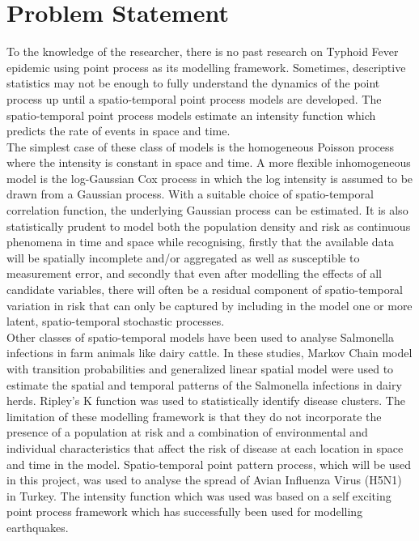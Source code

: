 \documentclass[a4paper]{thesis}
\begin{document}
\section{Problem Statement}

To the knowledge of the researcher, there is no past research on Typhoid Fever epidemic using point process as its modelling framework. Sometimes, descriptive statistics may not be enough to fully understand the dynamics of the point process up until a spatio-temporal point process models are developed. The spatio-temporal point process models estimate an intensity function which predicts the rate of events in space and time.\\

The simplest case of these class of models is the homogeneous Poisson process where the intensity is constant in space and time. A more 
flexible inhomogeneous model is the log-Gaussian Cox process in which the log intensity is assumed to be drawn from a Gaussian process.\cite{Diggle2014} With a suitable choice of spatio-temporal correlation function, the underlying
Gaussian process can be estimated. It is also statistically prudent to model both the population density and risk as continuous phenomena in time and space while recognising, firstly that the available data will be spatially incomplete and/or aggregated as well as susceptible to measurement error, and
secondly that even after modelling the effects of all candidate variables, there will often be a
residual component of spatio-temporal variation in risk that can only be captured by including
in the model one or more latent, spatio-temporal stochastic processes.\\

Other classes of spatio-temporal models have been used to analyse Salmonella infections in farm animals like dairy cattle. \cite{Fenton} \cite{Cox} In these studies, Markov Chain model with transition probabilities and generalized linear spatial model were used to estimate the spatial and temporal patterns of the Salmonella infections in dairy herds. Ripley’s K function was used to statistically identify disease clusters. The limitation of these modelling framework is that they do not incorporate the presence of a population at risk and a combination of environmental and individual characteristics that affect the risk of disease at each location in space and time in the model. Spatio-temporal point pattern process, which will be used in this project, was used to analyse the spread of Avian Influenza Virus (H5N1) in Turkey. The intensity function which was used was based on a self exciting point process framework which has successfully been used for modelling earthquakes.\cite{Kim} \cite{Ogata} \\ 
\end{document}
